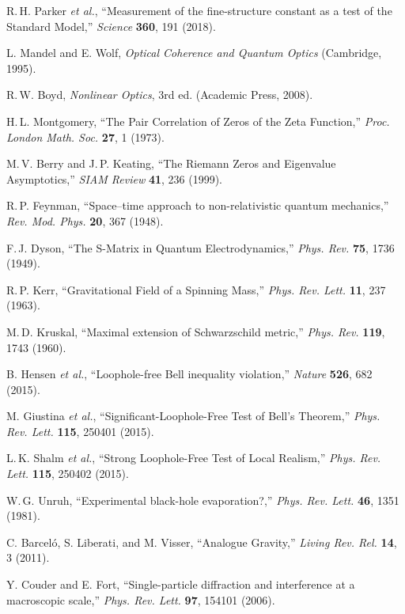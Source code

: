 \documentclass[reprint,amsmath,amssymb,aps]{revtex4-2}
\begin{document}
\begin{thebibliography}{99}
R.\,H. Parker \emph{et al.}, ``Measurement of the fine-structure constant as a test of the Standard Model,'' \emph{Science} \textbf{360}, 191 (2018).

L. Mandel and E. Wolf, \emph{Optical Coherence and Quantum Optics} (Cambridge, 1995).

R.\,W. Boyd, \emph{Nonlinear Optics}, 3rd ed. (Academic Press, 2008).

H.\,L. Montgomery, ``The Pair Correlation of Zeros of the Zeta Function,'' \emph{Proc. London Math. Soc.} \textbf{27}, 1 (1973).

M.\,V. Berry and J.\,P. Keating, ``The Riemann Zeros and Eigenvalue Asymptotics,'' \emph{SIAM Review} \textbf{41}, 236 (1999).

R.\,P. Feynman, ``Space–time approach to non-relativistic quantum mechanics,'' \emph{Rev. Mod. Phys.} \textbf{20}, 367 (1948).

F.\,J. Dyson, ``The S-Matrix in Quantum Electrodynamics,'' \emph{Phys. Rev.} \textbf{75}, 1736 (1949).

R.\,P. Kerr, ``Gravitational Field of a Spinning Mass,'' \emph{Phys. Rev. Lett.} \textbf{11}, 237 (1963).

M.\,D. Kruskal, ``Maximal extension of Schwarzschild metric,'' \emph{Phys. Rev.} \textbf{119}, 1743 (1960).

B. Hensen \emph{et al.}, ``Loophole-free Bell inequality violation,'' \emph{Nature} \textbf{526}, 682 (2015).

M. Giustina \emph{et al.}, ``Significant-Loophole-Free Test of Bell’s Theorem,'' \emph{Phys. Rev. Lett.} \textbf{115}, 250401 (2015).

L.\,K. Shalm \emph{et al.}, ``Strong Loophole-Free Test of Local Realism,'' \emph{Phys. Rev. Lett.} \textbf{115}, 250402 (2015).

W.\,G. Unruh, ``Experimental black-hole evaporation?,'' \emph{Phys. Rev. Lett.} \textbf{46}, 1351 (1981).

C. Barceló, S. Liberati, and M. Visser, ``Analogue Gravity,'' \emph{Living Rev. Rel.} \textbf{14}, 3 (2011).

Y. Couder and E. Fort, ``Single-particle diffraction and interference at a macroscopic scale,'' \emph{Phys. Rev. Lett.} \textbf{97}, 154101 (2006).


\end{thebibliography}
\end{document}
